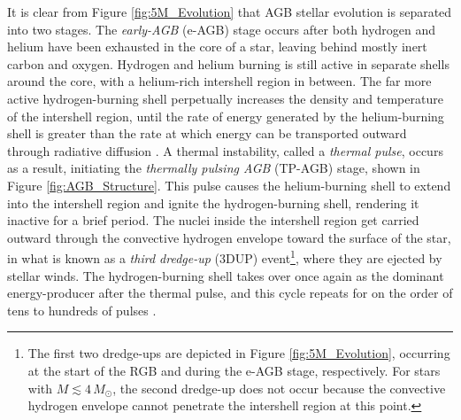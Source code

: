 It is clear from Figure \ref{fig:5M_Evolution} that AGB stellar evolution is separated into two stages. The \emph{early-AGB} (e-AGB) stage occurs after both hydrogen and helium have been exhausted in the core of a star, leaving behind mostly inert carbon and oxygen. Hydrogen and helium burning is still active in separate shells around the core, with a helium-rich intershell region in between. The far more active hydrogen-burning shell perpetually increases the density and temperature of the intershell region, until the rate of energy generated by the helium-burning shell is greater than the rate at which energy can be transported outward through radiative diffusion \cite{Iliadis2015}. A thermal instability, called a \emph{thermal pulse}, occurs as a result, initiating the \emph{thermally pulsing AGB} (TP-AGB) stage, shown in Figure \ref{fig:AGB_Structure}. This pulse causes the helium-burning shell to extend into the intershell region and ignite the hydrogen-burning shell, rendering it inactive for a brief period. The nuclei inside the intershell region get carried outward through the convective hydrogen envelope toward the surface of the star, in what is known as a \emph{third dredge-up} (3DUP) event\footnote{The first two dredge-ups are depicted in Figure \ref{fig:5M_Evolution}, occurring at the start of the RGB and during the e-AGB stage, respectively. For stars with $M \lesssim 4 \, M_{\odot}$, the second dredge-up does not occur because the convective hydrogen envelope cannot penetrate the intershell region at this point.}, where they are ejected by stellar winds. The hydrogen-burning shell takes over once again as the dominant energy-producer after the thermal pulse, and this cycle repeats for on the order of tens to hundreds of pulses \cite{Habing2004}.


